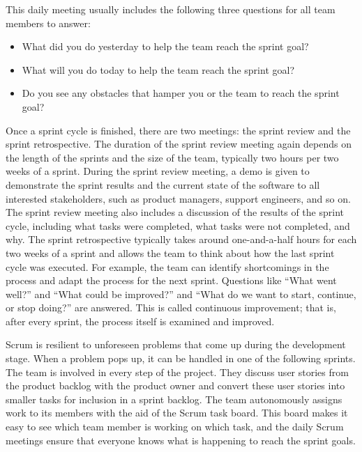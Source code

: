 This daily meeting usually includes the following three questions for all team members to answer:

\begin{itemize}
\item
What did you do yesterday to help the team reach the sprint goal?

\item
What will you do today to help the team reach the sprint goal?

\item
Do you see any obstacles that hamper you or the team to reach the sprint goal?
\end{itemize}

Once a sprint cycle is finished, there are two meetings: the sprint review and the sprint retrospective. The duration of the sprint review meeting again depends on the length of the sprints and the size of the team, typically two hours per two weeks of a sprint. During the sprint review meeting, a demo is given to demonstrate the sprint results and the current state of the software to all interested stakeholders, such as product managers, support engineers, and so on. The sprint review meeting also includes a discussion of the results of the sprint cycle, including what tasks were completed, what tasks were not completed, and why. The sprint retrospective typically takes around one-and-a-half hours for each two weeks of a sprint and allows the team to think about how the last sprint cycle was executed. For example, the team can identify shortcomings in the process and adapt the process for the next sprint. Questions like “What went well?” and “What could be improved?” and “What do we want to start, continue, or stop doing?” are answered. This is called continuous improvement; that is, after every sprint, the process itself is examined and improved.


Scrum is resilient to unforeseen problems that come up during the development stage. When a problem pops up, it can be handled in one of the following sprints. The team is involved in every step of the project. They discuss user stories from the product backlog with the product owner and convert these user stories into smaller tasks for inclusion in a sprint backlog. The team autonomously assigns work to its members with the aid of the Scrum task board. This board makes it easy to see which team member is working on which task, and the daily Scrum meetings ensure that everyone knows what is happening to reach the sprint goals.

